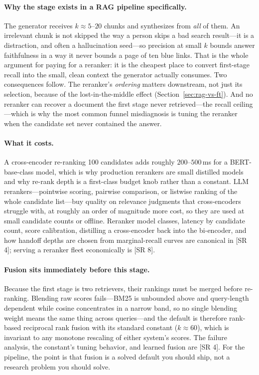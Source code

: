 \paragraph{Why the stage exists in a RAG pipeline specifically.}
The generator receives $k \approx 5$--$20$ chunks and synthesizes from
\emph{all} of them.  An irrelevant chunk is not skipped the way a person skips
a bad search result---it is a distraction, and often a hallucination seed---so
precision at small $k$ bounds answer faithfulness in a way it never bounds a
page of ten blue links.  That is the whole argument for paying for a reranker:
it is the cheapest place to convert first-stage recall into the small, clean
context the generator actually consumes.  Two consequences follow.  The
reranker's \emph{ordering} matters downstream, not just its selection, because
of the lost-in-the-middle effect (Section~\ref{sec:rag-vs-ft}).  And no
reranker can recover a document the first stage never retrieved---the recall
ceiling---which is why the most common funnel misdiagnosis is tuning the
reranker when the candidate set never contained the answer.

\paragraph{What it costs.}
A cross-encoder re-ranking 100 candidates adds roughly $200$--$500$\,ms for a
BERT-base-class model, which is why production rerankers are small distilled
models and why re-rank depth is a first-class budget knob rather than a
constant.  LLM rerankers---pointwise scoring, pairwise comparison, or listwise
ranking of the whole candidate list---buy quality on relevance judgments that
cross-encoders struggle with, at roughly an order of magnitude more cost, so
they are used at small candidate counts or offline.  Reranker model classes,
latency by candidate count, score calibration, distilling a cross-encoder back
into the bi-encoder, and how handoff depths are chosen from marginal-recall
curves are canonical in [SR 4]; serving a reranker fleet economically is
[SR 8].

\paragraph{Fusion sits immediately before this stage.}
Because the first stage is two retrievers, their rankings must be merged
before re-ranking.  Blending raw scores fails---BM25 is unbounded above and
query-length dependent while cosine concentrates in a narrow band, so no
single blending weight means the same thing across queries---and the default
is therefore rank-based reciprocal rank fusion with its standard constant
($k \approx 60$), which is invariant to any monotone rescaling of either
system's scores.  The failure analysis, the constant's tuning behavior, and
learned fusion are [SR 4].  For the pipeline, the point is that fusion is a
solved default you should ship, not a research problem you should solve.



